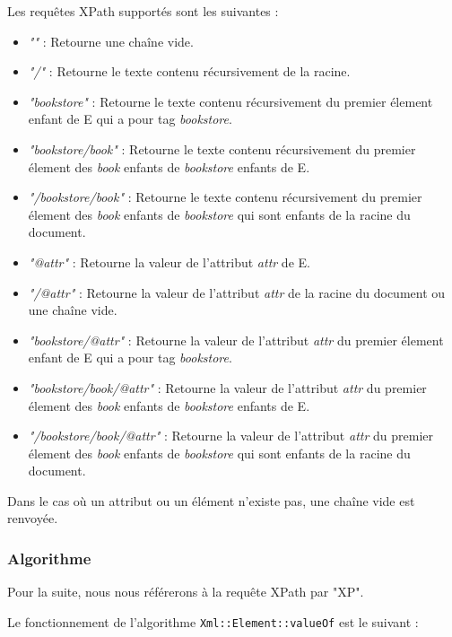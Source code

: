     Les requêtes XPath supportés sont les suivantes :
    \begin{itemize}
        \item \textit{""} : Retourne une chaîne vide.
        \item \textit{"/"} : Retourne le texte contenu récursivement de la racine.
        \item \textit{"bookstore"} : Retourne le texte contenu récursivement du premier élement enfant de E qui a pour tag \textit{bookstore}.
        \item \textit{"bookstore/book"} : Retourne le texte contenu récursivement du premier élement des \textit{book} enfants de \textit{bookstore} enfants de E.
        \item \textit{"/bookstore/book"} : Retourne le texte contenu récursivement du premier élement des \textit{book} enfants de \textit{bookstore} qui sont enfants de la racine du document.
        \item \textit{"@attr"} : Retourne la valeur de l'attribut \textit{attr} de E.
        \item \textit{"/@attr"} : Retourne la valeur de l'attribut \textit{attr} de la racine du document ou une chaîne vide.
        \item \textit{"bookstore/@attr"} : Retourne la valeur de l'attribut \textit{attr} du premier élement enfant de E qui a pour tag \textit{bookstore}.
        \item \textit{"bookstore/book/@attr"} : Retourne la valeur de l'attribut \textit{attr} du premier élement des \textit{book} enfants de \textit{bookstore} enfants de E.
        \item \textit{"/bookstore/book/@attr"} : Retourne la valeur de l'attribut \textit{attr} du premier élement des \textit{book} enfants de \textit{bookstore} qui sont enfants de la racine du document.
        \\
    \end{itemize}

    Dans le cas où un attribut ou un élément n'existe pas, une chaîne vide est renvoyée.

    \subsubsection{Algorithme}

    Pour la suite, nous nous référerons à la requête XPath par "XP".

    Le fonctionnement de l'algorithme \lstinline$Xml::Element::valueOf$ est le suivant :

